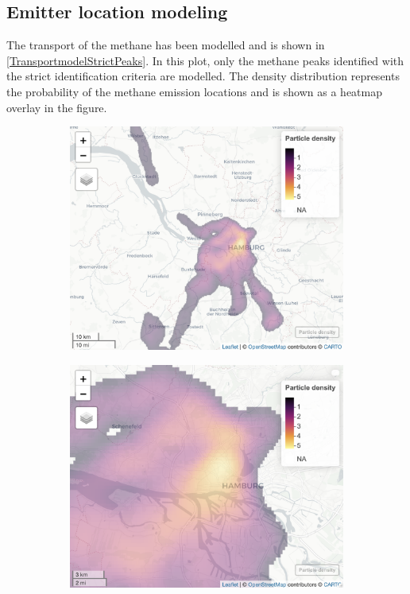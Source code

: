 \subsection{Emitter location modeling}
 The transport of the methane has been modelled and is shown in  \cref{TransportmodelStrictPeaks}. In this plot, only the methane peaks identified with the strict identification criteria are modelled. The density distribution represents the probability of the methane emission locations and is shown as a heatmap overlay in the figure.
\begin{figure}
\centering
\begin{subfigure}{.5\textwidth}
  \centering
  \includegraphics[width=1\linewidth]{figures/Appendix/Transportmodel/10_Emission_Distribution_with_Changing_Measured_Wind_strict_peaks.png}
  \caption{}
  \label{TransportmodelStrictPeaksLrage}
\end{subfigure}%
\begin{subfigure}{.5\textwidth}
  \centering
  \includegraphics[width=1\linewidth]{figures/Appendix/Transportmodel/10_Emission_Distribution_with_Changing_Measured_Wind_strict_peaks_Zoom.png}

\end{subfigure}
\end{figure}
